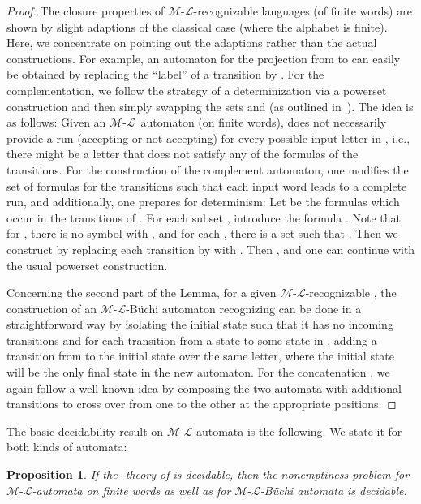 \documentclass[copyright,creativecommons]{eptcs}
\newtheorem{proposition}[theorem]{Proposition}
\theoremstyle{plain}
\theoremstyle{nonumberplain}
\newtheorem{proof}{Proof}
\newcommand{\eat}[1]{}
\newcommand{\m}{\ensuremath{\mathcal{M}}}
\newcommand{\el}{\ensuremath{\mathcal{L}}}
\newcommand{\ml}{\ensuremath{\m\textrm{-}\el}}
\begin{document}
\begin{proof}
The closure properties of \ml-recognizable languages (of finite words) are shown by slight 
adaptions of the classical case (where the alphabet is finite). 
Here, we concentrate on pointing out the adaptions rather than the actual constructions. 
For example, an automaton for the projection from  to  can easily be 
obtained by replacing the ``label'' 
 of a transition by . 
For the complementation, we follow the strategy of a determinization via a powerset construction and then simply swapping the sets  and  (as 
outlined in~\cite{bes08}). The idea is as follows\eat{ (for a full work-out see~\cite{win11})}: 
Given an \ml\ automaton  (on finite words),  does not 
necessarily provide a run (accepting or not accepting) for every possible 
input letter in , i.e., there might be a letter that does not satisfy 
any of the formulas of the transitions. For the construction of the complement automaton, 
one modifies the set of formulas for the transitions such that each input word
leads to a complete run, and additionally, one prepares for determinism: 
Let  be the formulas which occur in the transitions 
of . For each subset , introduce 
the formula . 
Note that for , there is no symbol  
with , 
 and for each , there is a set  such that . 
 Then we construct  by replacing each transition 
  by  with . 
Then , and one can continue with the usual 
powerset construction. 

Concerning the second part of the Lemma, 
for a given \ml-recognizable , 
the construction of an \ml-B{\"u}chi automaton recognizing  can be done 
in a straightforward way by isolating the initial state such that it has no incoming 
transitions and for each transition from a state  to some state in , adding a transition from  to the initial state over the same letter, where the initial state will be the only final state in the new automaton. 
For the concatenation , we again follow a well-known idea by composing 
the two automata with additional transitions to cross over from one to the other 
at the appropriate positions.
\end{proof}

The basic decidability result on \ml-automata is the following. We state it 
for both kinds of automata: 

\begin{proposition}\label{prop:emptinessbuechi}
If the -theory of  is decidable, then the nonemptiness problem 
for \ml-automata on finite words as well as for \ml-B{\"u}chi automata is decidable.
\end{proposition}
\end{document}
